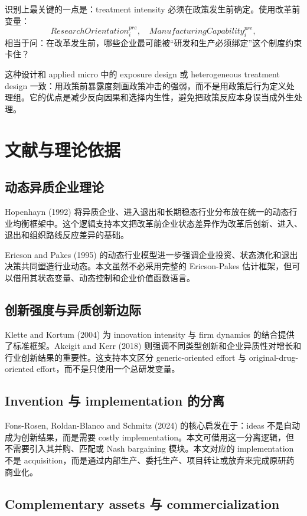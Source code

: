 \documentclass[12pt]{ctexart}
\begin{document}
识别上最关键的一点是：treatment intensity 必须在政策发生前确定。使用改革前变量：
\[
ResearchOrientation_i^{pre},\quad ManufacturingCapability_i^{pre},
\]
相当于问：在改革发生前，哪些企业最可能被“研发和生产必须绑定”这个制度约束卡住？

这种设计和 applied micro 中的 exposure design 或 heterogeneous treatment design 一致：用政策前暴露度刻画政策冲击的强弱，而不是用政策后行为定义处理组。它的优点是减少反向因果和选择内生性，避免把政策反应本身误当成外生处理。

\section{文献与理论依据}

\subsection{动态异质企业理论}

Hopenhayn (1992) 将异质企业、进入退出和长期稳态行业分布放在统一的动态行业均衡框架中。这个逻辑支持本文把改革前企业状态差异作为改革后创新、进入、退出和组织路线反应差异的基础。

Ericson and Pakes (1995) 的动态行业模型进一步强调企业投资、状态演化和退出决策共同塑造行业动态。本文虽然不必采用完整的 Ericson-Pakes 估计框架，但可以借用其状态变量、动态控制和企业价值函数语言。

\subsection{创新强度与异质创新边际}

Klette and Kortum (2004) 为 innovation intensity 与 firm dynamics 的结合提供了标准框架。Akcigit and Kerr (2018) 则强调不同类型创新和企业异质性对增长和行业创新结果的重要性。这支持本文区分 generic-oriented effort 与 original-drug-oriented effort，而不是只使用一个总研发变量。

\subsection{Invention 与 implementation 的分离}

Fons-Rosen, Roldan-Blanco and Schmitz (2024) 的核心启发在于：ideas 不是自动成为创新结果，而是需要 costly implementation。本文可借用这一分离逻辑，但不需要引入其并购、匹配或 Nash bargaining 模块。本文对应的 implementation 不是 acquisition，而是通过内部生产、委托生产、项目转让或放弃来完成原研药商业化。

\subsection{Complementary assets 与 commercialization}
\end{document}
